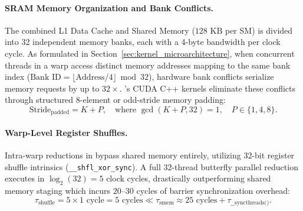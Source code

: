 \paragraph{SRAM Memory Organization and Bank Conflicts.} The combined L1 Data Cache and Shared Memory ($128\text{ KB}$ per SM) is divided into 32 independent memory banks, each with a 4-byte bandwidth per clock cycle. As formulated in Section~\ref{sec:kernel_microarchitecture}, when concurrent threads in a warp access distinct memory addresses mapping to the same bank index ($\text{Bank ID} = \lfloor \text{Address}/4 \rfloor \bmod 32$), hardware bank conflicts serialize memory requests by up to $32\times$. \neuralops{}'s CUDA C++ kernels eliminate these conflicts through structured 8-element or odd-stride memory padding:
\begin{equation}
\label{eq:smem_padding_rule}
\text{Stride}_{\text{padded}} = K + P, \quad \text{where } \gcd(K + P, 32) = 1, \quad P \in \{1, 4, 8\}.
\end{equation}

\paragraph{Warp-Level Register Shuffles.} Intra-warp reductions in \neuralops{} bypass shared memory entirely, utilizing 32-bit register shuffle intrinsics (\texttt{\_\_shfl\_xor\_sync}). A full 32-thread butterfly parallel reduction executes in $\log_2(32) = 5$ clock cycles, drastically outperforming shared memory staging which incurs $20\text{--}30$ cycles of barrier synchronization overhead:
\begin{equation}
\label{eq:warp_butterfly_latency}
\tau_{\text{shuffle}} = 5 \times 1\text{ cycle} = 5\text{ cycles} \ll \tau_{\text{smem}} \approx 25\text{ cycles} + \tau_{\text{\_\_syncthreads()}}.
\end{equation}

